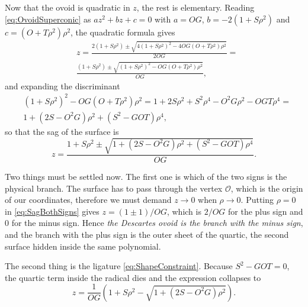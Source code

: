                 Now that the ovoid is quadratic in $z$, the rest is elementary. Reading \ref{eq:OvoidSuperconic} as $az^2+bz+c=0$ with $a = OG$, $b = -2(1+S\rho^2)$ and $c = (O+T\rho^2)\rho^2$, the quadratic formula gives
                \begin{align*}
                    & z = \frac{2\left( 1+S\rho^2 \right) \pm \sqrt{4\left( 1+S\rho^2 \right)^2 - 4OG\left( O+T\rho^2 \right)\rho^2}}{2OG} = \\
                    & \frac{\left( 1+S\rho^2 \right)\pm\sqrt{\left( 1+S\rho^2 \right)^2 - OG\left( O+T\rho^2 \right)\rho^2}}{OG},
                \end{align*}
                and expanding the discriminant
                \begin{align*}
                    & \left( 1+S\rho^2 \right)^2 - OG\left( O+T\rho^2 \right)\rho^2 = 1 + 2S\rho^2 + S^2\rho^4 - O^2G\rho^2 - OGT\rho^4 = \\
                    & 1 + \left( 2S - O^2G \right)\rho^2 + \left( S^2 - GOT \right)\rho^4,
                \end{align*}
                so that the sag of the surface is
                \begin{equation}\label{eq:SagBothSigns}
                    z = \frac{1 + S\rho^2 \pm \sqrt{1 + \left(2S - O^2G\right)\rho^2 + \left(S^2 - GOT\right)\rho^4}}{OG}.
                \end{equation}

                Two things must be settled now. The first one is which of the two signs is the physical branch. The surface has to pass through the vertex $\mathcal{O}$, which is the origin of our coordinates, therefore we must demand $z\to0$ when $\rho\to0$. Putting $\rho=0$ in \ref{eq:SagBothSigns} gives $z = (1\pm1)/OG$, which is $2/OG$ for the plus sign and $0$ for the minus sign. Hence \textit{the Descartes ovoid is the branch with the minus sign}, and the branch with the plus sign is the outer sheet of the quartic, the second surface hidden inside the same polynomial.

                The second thing is the ligature \ref{eq:ShapeConstraint}. Because $S^2 - GOT = 0$, the quartic term inside the radical dies and the expression collapses to
                \begin{equation}\label{eq:SagMinus}
                    z = \frac{1}{OG}\left( 1 + S\rho^2 - \sqrt{1 + \left( 2S - O^2G \right)\rho^2} \right).
                \end{equation}

